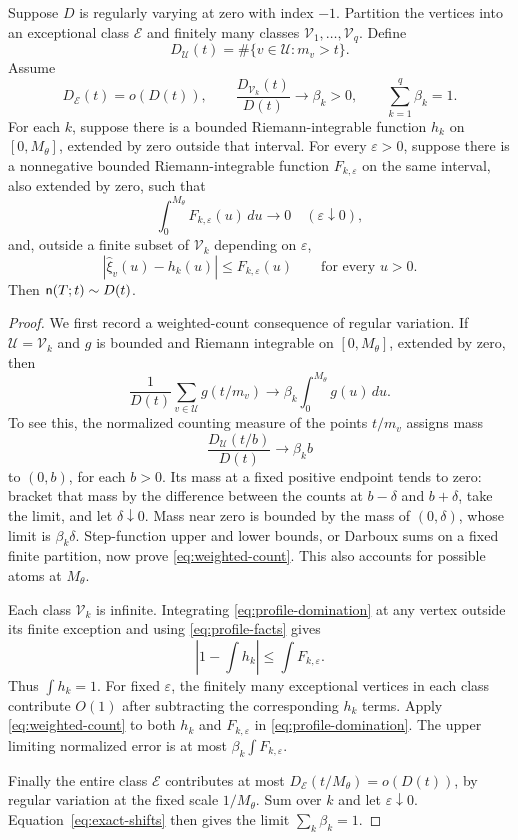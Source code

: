 \begin{theorem}\label{thm:profile}
Suppose $D$ is regularly varying at zero with index $-1$.
Partition the vertices into an exceptional class $\mathcal E$ and
finitely many classes $\mathcal V_1,\ldots,\mathcal V_q$. Define
\[
 D_{\mathcal U}(t)=\#\{v\in\mathcal U:m_v>t\}.
\]
Assume
\[
 D_{\mathcal E}(t)=o(D(t)),\qquad
 \frac{D_{\mathcal V_k}(t)}{D(t)}\longrightarrow\beta_k>0,
 \qquad \sum_{k=1}^q\beta_k=1.
\]
For each $k$, suppose there is a bounded Riemann-integrable function
$h_k$ on $[0,M_\theta]$, extended by zero outside that interval.
For every $\varepsilon>0$, suppose there is a nonnegative bounded
Riemann-integrable function $F_{k,\varepsilon}$ on the same interval,
also extended by zero, such that
\[
 \int_0^{M_\theta}F_{k,\varepsilon}(u)\,du\longrightarrow0
 \quad(\varepsilon\downarrow0),
\]
and, outside a finite subset of $\mathcal V_k$ depending on $\varepsilon$,
\begin{equation}\label{eq:profile-domination}
 |\widehat\xi_v(u)-h_k(u)|\le F_{k,\varepsilon}(u)
 \qquad\text{for every }u>0.
\end{equation}
Then $\mathsf n(T;t)\sim D(t)$.
\end{theorem}
\begin{proof}
We first record a weighted-count consequence of regular variation.
If $\mathcal U=\mathcal V_k$ and $g$ is bounded and Riemann integrable
on $[0,M_\theta]$, extended by zero, then
\begin{equation}\label{eq:weighted-count}
 \frac1{D(t)}\sum_{v\in\mathcal U}g(t/m_v)
 \longrightarrow\beta_k\int_0^{M_\theta}g(u)\,du.
\end{equation}
To see this, the normalized counting measure of the points $t/m_v$
assigns mass
\[
 \frac{D_{\mathcal U}(t/b)}{D(t)}\longrightarrow\beta_k b
\]
to $(0,b)$, for each $b>0$. Its mass at a fixed positive endpoint tends
to zero: bracket that mass by the difference between the counts at
$b-\delta$ and $b+\delta$, take the limit, and let $\delta\downarrow0$.
Mass near zero is bounded by the mass of $(0,\delta)$, whose limit is
$\beta_k\delta$. Step-function upper and lower bounds, or Darboux sums
on a fixed finite partition, now prove \eqref{eq:weighted-count}.
This also accounts for possible atoms at $M_\theta$.

Each class $\mathcal V_k$ is infinite. Integrating
\eqref{eq:profile-domination} at any vertex outside its finite exception
and using \eqref{eq:profile-facts} gives
\[
 \left|1-\int h_k\right|\le\int F_{k,\varepsilon}.
\]
Thus $\int h_k=1$. For fixed $\varepsilon$, the finitely many exceptional
vertices in each class contribute $O(1)$ after subtracting the
corresponding $h_k$ terms. Apply \eqref{eq:weighted-count} to both
$h_k$ and $F_{k,\varepsilon}$ in \eqref{eq:profile-domination}. The
upper limiting normalized error is at most
$\beta_k\int F_{k,\varepsilon}$.

Finally the entire class $\mathcal E$ contributes at most
$D_{\mathcal E}(t/M_\theta)=o(D(t))$, by regular variation at the fixed
scale $1/M_\theta$. Sum over $k$ and let $\varepsilon\downarrow0$.
Equation~\eqref{eq:exact-shifts} then gives the limit $\sum_k\beta_k=1$.
\end{proof}

